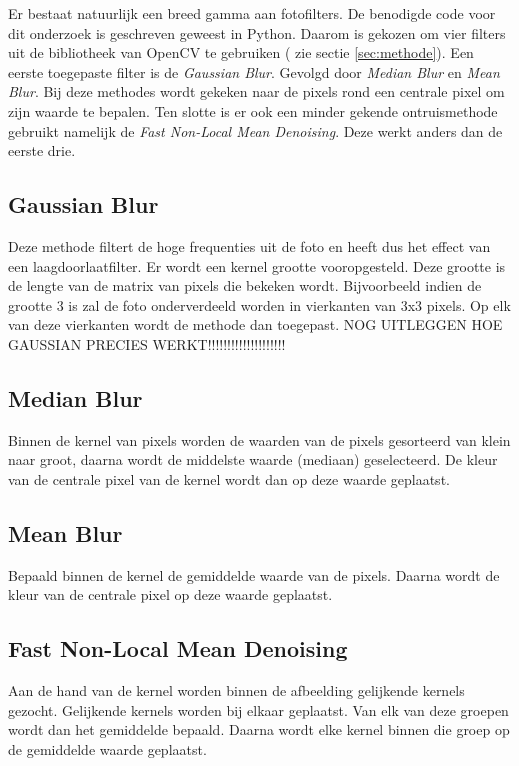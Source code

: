 Er bestaat natuurlijk een breed gamma aan fotofilters. De benodigde code voor dit onderzoek is geschreven geweest in Python. Daarom is gekozen om vier filters uit de bibliotheek van OpenCV te gebruiken ( zie sectie \ref{sec:methode}).  Een eerste toegepaste filter is de \textit{Gaussian Blur}. Gevolgd door \textit{Median Blur} en \textit{Mean Blur}. Bij deze methodes wordt gekeken naar de pixels rond een centrale pixel om zijn waarde te bepalen. Ten slotte is er ook een minder gekende ontruismethode gebruikt namelijk de \textit{Fast Non-Local Mean Denoising}. Deze werkt anders dan de eerste drie.

\subsection{Gaussian Blur}
Deze methode filtert de hoge frequenties uit de foto en heeft dus het effect van een laagdoorlaatfilter. Er wordt een kernel grootte vooropgesteld. Deze grootte is de lengte van de matrix van pixels die bekeken wordt. Bijvoorbeeld indien de grootte 3 is zal de foto onderverdeeld worden in vierkanten van 3x3 pixels. Op elk van deze vierkanten wordt de methode dan toegepast. NOG UITLEGGEN HOE GAUSSIAN PRECIES WERKT!!!!!!!!!!!!!!!!!!!!

\subsection{Median Blur}
Binnen de kernel van pixels worden de waarden van de pixels gesorteerd van klein naar groot, daarna wordt de middelste waarde (mediaan) geselecteerd. De kleur van de centrale pixel van de kernel wordt dan op deze waarde geplaatst.

\subsection{Mean Blur}
Bepaald binnen de kernel de gemiddelde waarde van de pixels. Daarna wordt de kleur van de centrale pixel op deze waarde geplaatst.

\subsection{Fast Non-Local Mean Denoising}
Aan  de hand van de kernel worden binnen de afbeelding gelijkende kernels gezocht. Gelijkende kernels worden bij elkaar geplaatst. Van elk van deze groepen wordt dan het gemiddelde bepaald. Daarna wordt elke kernel binnen die groep op de gemiddelde waarde geplaatst. 